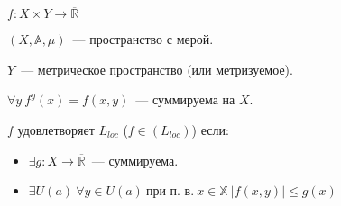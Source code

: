 \documentclass[paper=a4, fontsize=17pt]{article}
\begin{document}
	$ f : X \times Y \rightarrow \overline{\mathbb{R}}$

	$ (X, \mathds{A}, \mu) $~--- пространство с мерой.

	$Y$~--- метрическое пространство (или метризуемое).

	$\forall y \ f^y(x) = f(x, y)$~--- суммируема на $X$.

	$f$ удовлетворяет $L_{loc}$ ($ f \in (L_{loc}) $) если:
	\begin{itemize}
		\item $ \exists g : X \rightarrow \overline{\mathbb{R}} $~--- суммируема.
		\item $ \exists U(a) \ \forall y \in \dot{U} (a) \ \text{при п. в.} ~ x \in \mathbb{X} ~ |f(x, y)| \leq g(x)$
	\end{itemize}
\end{document}
